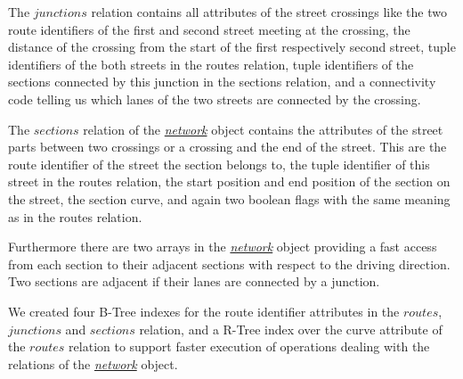 \documentclass[a4paper]{article}
\newcommand{\dt}[1]{\textsl{\underline{#1}}}
\begin{document}
The $junctions$ relation contains all attributes of the street
crossings like the two route identifiers of the first and second street meeting at the
crossing, the distance of the crossing from the start of the first respectively
second street, tuple identifiers of the both streets in the routes relation,
tuple identifiers of the sections connected by this junction in the sections relation,
and a connectivity code telling us which lanes of the two streets are connected
by the crossing.

The $sections$ relation of the \dt{network} object contains the
attributes of the street parts between two crossings or a crossing and
the end of the street. This are the route identifier of the street the section
belongs to, the tuple identifier of this street in the routes relation, the start
position and end position of the section on the street, the section curve, and
again two boolean flags with the same meaning as in the routes relation.

Furthermore there are two arrays in the \dt{network} object providing a fast
access from each section to their adjacent sections with respect to the driving
direction. Two sections are adjacent if their lanes are connected by a junction.

We created four B-Tree indexes for the route identifier attributes in the $routes$,
$junctions$ and $sections$ relation, and a R-Tree index over the curve attribute
of the $routes$ relation to support faster execution of operations dealing with
the relations of the \dt{network} object.
\end{document}
